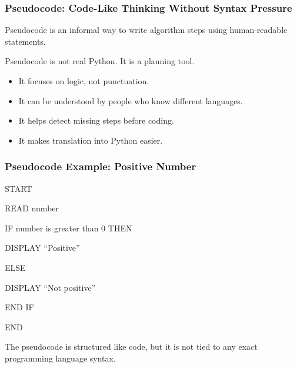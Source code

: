 \documentclass[aspectratio=169,10pt]{beamer}
\begin{document}
\begin{frame}
\frametitle{Pseudocode: Code-Like Thinking Without Syntax Pressure}
\vspace{0.85cm}
\begin{tcolorbox}[lecturebox,title=Key idea]
Pseudocode is an informal way to write algorithm steps using human-readable statements.
\end{tcolorbox}
\vspace{0.18cm}
Pseudocode is not real Python. It is a planning tool.
\vspace{0.18cm}
\begin{tcolorbox}[lecturebox,title=Why use pseudocode?]
\begin{itemize}\setlength\itemsep{0.12cm}
  \item It focuses on logic, not punctuation.
  \item It can be understood by people who know different languages.
  \item It helps detect missing steps before coding.
  \item It makes translation into Python easier.
\end{itemize}
\end{tcolorbox}
\end{frame}


\begin{frame}
\frametitle{Pseudocode Example: Positive Number}
\vspace{0.55cm}
\begin{tcolorbox}[colback=gray!6,colframe=LineGray,boxrule=0.35pt,arc=0pt,left=1.5mm,right=1.5mm,top=1.5mm,bottom=1.5mm]
{\ttfamily\large
START\par
READ number\par
IF number is greater than 0 THEN\par
\hspace*{1cm}DISPLAY ``Positive''\par
ELSE\par
\hspace*{1cm}DISPLAY ``Not positive''\par
END IF\par
END\par
}
\end{tcolorbox}
\vspace{0.25cm}
\begin{tcolorbox}[lecturebox,title=Notice]
The pseudocode is structured like code, but it is not tied to any exact programming language syntax.
\end{tcolorbox}
\end{frame}
\end{document}
